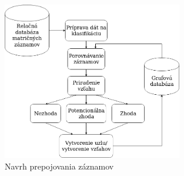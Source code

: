 \begin{figure}[h!]
  \label{navrh}
  \begin{center}
  \includegraphics[width=0.7\textwidth]{obrazky-figures/navrh_riesenia2.png}
  \caption{Navrh prepojovania záznamov}
  \end{center}
\end{figure}
\newpage
